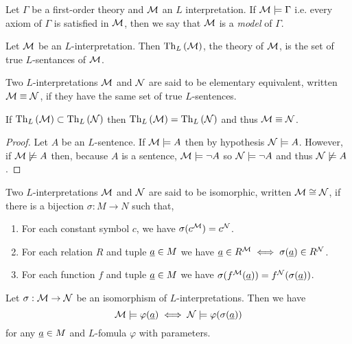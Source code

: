 \documentclass[12pt]{article}
\begin{document}
\begin{definition}
Let $\Gamma$ be a first-order theory and $\mathcal{M}$ an $L$ interpretation. If $\mathcal{M} \models \Gamma$ i.e. every axiom of $\Gamma$ is satisfied in $\mathcal{M}$, then we say that $\mathcal{M}$ is a \textit{model} of $\Gamma$.
\end{definition}

\begin{definition}
Let $\mathcal{M}$ be an $L$-interpretation. Then $\mathrm{Th}_{L} \left( \mathcal{M} \right)$, the theory of $\mathcal{M}$, is the set of true $L$-sentances of $\mathcal{M}$.
\end{definition}

\begin{definition}
Two $L$-interpretations $\mathcal{M}$ and $\mathcal{N}$ are said to be elementary equivalent, written $\mathcal{M} \equiv \mathcal{N}$, if they have the same set of true $L$-sentences.  
\end{definition}

\begin{lemma}
If $\mathrm{Th}_{L} \left( \mathcal{M} \right) \subset \mathrm{Th}_{L} \left( \mathcal{N} \right)$ then $\mathrm{Th}_{L} \left( \mathcal{M} \right) = \mathrm{Th}_{L} \left( \mathcal{N} \right)$ and thus $\mathcal{M} \equiv \mathcal{N}$.
\end{lemma}

\begin{proof}
Let $A$ be an $L$-sentence. If $\mathcal{M} \models A$  then by hypothesis $\mathcal{N} \models A$. However, if $\mathcal{M} \not\models A$ then, because $A$ is a sentence, $\mathcal{M} \models \neg A$ so $\mathcal{N} \models \neg A$ and thus $\mathcal{N} \not\models A$.  
\end{proof}

\begin{definition}
Two $L$-interpretations $\mathcal{M}$ and $\mathcal{N}$ are said to be isomorphic, written $\mathcal{M} \cong \mathcal{N}$, if there is a bijection $\sigma : M \to N$ such that,
\begin{enumerate}
\item For each constant symbol $c$, we have $\sigma(c^{\mathcal{M}}) = c^{\mathcal{N}}$.
\item For each relation $R$ and tuple $\underline{a} \in M$ we have $\underline{a} \in R^{\mathcal{M}} \iff \sigma(\underline{a}) \in R^{\mathcal{N}}$.
\item For each function $f$ and tuple $\underline{a} \in M$ we have $\sigma(f^{\mathcal{M}}(\underline{a})) = f^{\mathcal{N}}(\sigma(\underline{a}))$. 
\end{enumerate} 
\end{definition}

\begin{proposition}
Let $\sigma : \mathcal{M} \to \mathcal{N}$ be an isomorphism of $L$-interpretations. Then we have
\[\mathcal{M} \models \varphi(\underline{a}) \iff \mathcal{N} \models \varphi(\sigma(\underline{a}))\]
for any $\underline{a} \in M$ and $L$-fomula $\varphi$ with parameters. 
\end{proposition}
\end{document}
